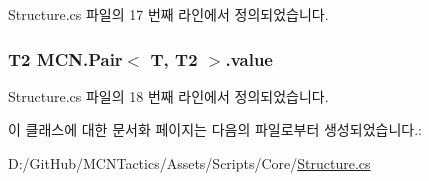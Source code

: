 Structure.\+cs 파일의 17 번째 라인에서 정의되었습니다.

\subsubsection[{\texorpdfstring{value}{value}}]{\setlength{\rightskip}{0pt plus 5cm}T2 {\bf M\+C\+N.\+Pair}$<$ T, T2 $>$.value}\hypertarget{class_m_c_n_1_1_pair_a1980bbf37b60fcbfea22382f71250e84}{}\label{class_m_c_n_1_1_pair_a1980bbf37b60fcbfea22382f71250e84}


Structure.\+cs 파일의 18 번째 라인에서 정의되었습니다.



이 클래스에 대한 문서화 페이지는 다음의 파일로부터 생성되었습니다.\+:\begin{DoxyCompactItemize}
\item 
D\+:/\+Git\+Hub/\+M\+C\+N\+Tactics/\+Assets/\+Scripts/\+Core/\hyperlink{_structure_8cs}{Structure.\+cs}\end{DoxyCompactItemize}
